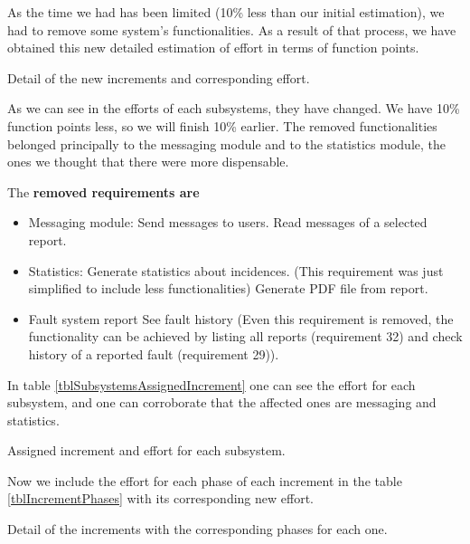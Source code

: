 As the time we had has been limited (10\% less than our initial estimation), we had to remove some system's functionalities. As a result of that process, we have obtained this new detailed estimation of effort in terms of function points.

\begin{table}[hbtp]
\centering

\caption{Detail of the new increments and corresponding effort.}
\label{tblIncrementsSubsystems}
\end{table}

As we can see in the efforts of each subsystems, they have changed. We have 10\% function points less, so we will finish 10\% earlier. The removed functionalities belonged principally to the messaging module and to the statistics module, the ones we thought that there were more dispensable.

The \textbf{removed requirements are} 

\begin{itemize}
\item Messaging module:
\subitem[21] Send messages to users.
\subitem[22] Read messages of a selected report.
\item Statistics:
\subitem[36] Generate statistics about incidences. (This requirement was just simplified to include less functionalities)
\subitem[37] Generate PDF file from report.
\item Fault system report
\subitem[26] See fault history (Even this requirement is removed, the functionality can be achieved by listing all reports (requirement 32) and check history of a reported fault (requirement 29)).
\end{itemize}



In table \ref{tblSubsystemsAssignedIncrement} one can see the effort for each subsystem, and one can corroborate that the affected ones are messaging and statistics.

\begin{table}[hbtp]
\centering

\caption{Assigned increment and effort for each subsystem.}
\label{tblSubsystemsAssignedIncrement}
\end{table}

Now we include the effort for each phase of each increment in the table \ref{tblIncrementPhases} with its corresponding new effort.

\begin{table}[hbtp]
\centering

\caption{Detail of the increments with the corresponding phases for each one.}
\label{tblIncrementPhases}
\end{table}
